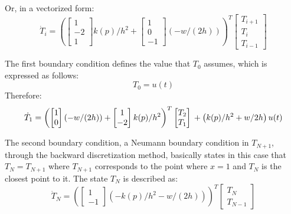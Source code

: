 Or, in a vectorized form:
\begin{equation} \label{eqn:lineardiffusion_fdm2}
  \dot{T}_i =
  \left(
   \begin{bmatrix}
     1\\
     -2\\
     1
  \end{bmatrix}k(p)/h^2
      +
 \begin{bmatrix}
     1\\
     0\\
     -1
  \end{bmatrix}(- w/(2h))
  \right)^T
  \begin{bmatrix}
      T_{i+1}\\
      T_i\\
      T_{i-1}
  \end{bmatrix}
\end{equation}


The first boundary condition defines the value that $T_0$ assumes, which is expressed as follows:
\begin{equation}
    T_0 = u(t)
\end{equation}
Therefore:
\begin{equation} \label{eqn:linearfdm_boundary1}
  \dot{T}_1 =
  \left(
  \begin{bmatrix}
     1\\
     0
  \end{bmatrix}(- w/(2h)) +
  \begin{bmatrix}
     1\\
     -2
  \end{bmatrix}k(p)/h^2\right)^T
  \begin{bmatrix}
      T_2\\
      T_1
  \end{bmatrix}\\
  + \left (k(p)/h^2 + w/2h\right )u(t)
\end{equation}



The second boundary condition, a Neumann boundary condition \cite{Thomee20011} in $T_{N+1}$, through the backward discretization method, basically states in this case that $T_{N} = T_{N+1}$ where $T_{N+1}$ corresponds to the point where $x = 1$ and $T_{N}$ is the closest point to it.
%
The state $T_N$ is described as:
\begin{equation} \label{eqn:linearfdm_boundary2}
  \dot{T}_N =
  \left(\begin{bmatrix}
     1\\
     -1
  \end{bmatrix}\left(- k(p)/h^2-w/(2h)\right)\right)^T
  \begin{bmatrix}
      T_N\\
      T_{N-1}
  \end{bmatrix}
\end{equation}



